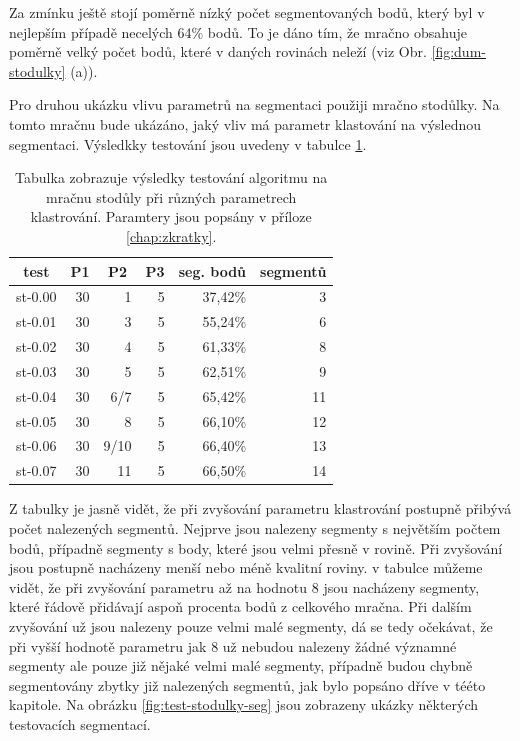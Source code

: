 \documentclass[11pt,twoside,a4paper]{book}
\begin{document}
Za zmínku ještě stojí poměrně nízký počet segmentovaných bodů, který byl v nejlepším případě necelých 64\% bodů. To je dáno tím, že mračno obsahuje poměrně velký počet bodů, které v daných rovinách neleží (viz Obr. \ref{fig:dum-stodulky} (a)).

Pro druhou ukázku vlivu parametrů na segmentaci použiji mračno stodůlky. Na tomto mračnu bude ukázáno, jaký vliv má parametr klastování na výslednou segmentaci. Výsledkky testování jsou uvedeny v tabulce \ref{table:test3-klastr}.

\begin{table}[ht]
\begin{center}
\begin{tabular}{|r|r|r|r|r|r|}
\hline
\multicolumn{1}{|c|}{\textbf{test}} & \multicolumn{1}{c|}{\textbf{P1}} & \multicolumn{1}{c|}{\textbf{P2}} & \multicolumn{1}{c|}{\textbf{P3}} & \multicolumn{1}{c|}{\textbf{seg. bodů}} & \multicolumn{1}{c|}{\textbf{segmentů}} \\ \hline
st-0.00 & 30 & 1 & 5 & 37,42\% & 3 \\ \hline
st-0.01 & 30 & 3 & 5 & 55,24\% & 6 \\ \hline
st-0.02 & 30 & 4 & 5 & 61,33\% & 8 \\ \hline
st-0.03 & 30 & 5 & 5 & 62,51\% & 9 \\ \hline
st-0.04 & 30 & 6/7 & 5 & 65,42\% & 11 \\ \hline
st-0.05 & 30 & 8 & 5 & 66,10\% & 12 \\ \hline
st-0.06 & 30 & 9/10 & 5 & 66,40\% & 13 \\ \hline
st-0.07 & 30 & 11 & 5 & 66,50\% & 14 \\ \hline
\end{tabular}
\caption{Tabulka zobrazuje výsledky testování algoritmu na mračnu stodůly při různých parametrech klastrování. Paramtery jsou popsány v příloze \ref{chap:zkratky}.} 
\label{table:test3-klastr}
\end{center}
\end{table}

Z tabulky je jasně vidět, že při zvyšování parametru klastrování postupně přibývá počet nalezených segmentů. Nejprve jsou nalezeny segmenty s největším počtem bodů, případně segmenty s body, které jsou velmi přesně v rovině. Při zvyšování jsou postupně nacházeny menší nebo méně kvalitní roviny. v tabulce můžeme vidět, že při zvyšování parametru až na hodnotu 8 jsou nacházeny segmenty, které řádově přidávají aspoň procenta bodů z celkového mračna. Při dalším zvyšování už jsou nalezeny pouze velmi malé segmenty, dá se tedy očekávat, že při vyšší hodnotě parametru jak 8 už nebudou nalezeny žádné významné segmenty ale pouze již nějaké velmi malé segmenty, případně budou chybně segmentovány zbytky již nalezených segmentů, jak bylo popsáno dříve v tééto kapitole. Na obrázku \ref{fig:test-stodulky-seg} jsou zobrazeny ukázky některých testovacích segmentací.
\end{document}
